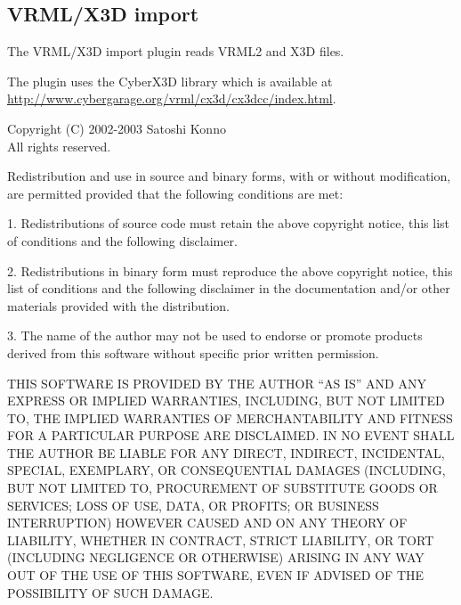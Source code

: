 
\subsection{VRML/X3D import}

The VRML/X3D import plugin reads VRML2 and X3D files.



\begin{notice}[note]
The plugin uses the CyberX3D library which is available at 
\url{http://www.cybergarage.org/vrml/cx3d/cx3dcc/index.html}.

Copyright (C) 2002-2003 Satoshi Konno\\
All rights reserved.

Redistribution and use in source and binary forms, with or without modification, are permitted provided that the following conditions are met:

1. Redistributions of source code must retain the above copyright notice, this list of conditions and the following disclaimer. 

2. Redistributions in binary form must reproduce the above copyright notice, this list of conditions and the following disclaimer in the documentation and/or other materials provided with the distribution. 

3. The name of the author may not be used to endorse or promote products derived from this software without specific prior written permission. 

THIS SOFTWARE IS PROVIDED BY THE AUTHOR ``AS IS'' AND ANY EXPRESS OR IMPLIED WARRANTIES, INCLUDING, BUT NOT LIMITED TO, THE IMPLIED WARRANTIES OF MERCHANTABILITY AND FITNESS FOR A PARTICULAR PURPOSE ARE DISCLAIMED. IN NO EVENT SHALL THE AUTHOR BE LIABLE FOR ANY DIRECT, INDIRECT, INCIDENTAL, SPECIAL, EXEMPLARY, OR CONSEQUENTIAL DAMAGES (INCLUDING, BUT NOT LIMITED TO, PROCUREMENT OF SUBSTITUTE GOODS OR SERVICES; LOSS OF USE, DATA, OR PROFITS; OR BUSINESS INTERRUPTION) HOWEVER CAUSED AND ON ANY THEORY OF LIABILITY, WHETHER IN CONTRACT, STRICT LIABILITY, OR TORT (INCLUDING NEGLIGENCE OR OTHERWISE) ARISING IN ANY WAY OUT OF THE USE OF THIS SOFTWARE, EVEN IF ADVISED OF THE POSSIBILITY OF SUCH DAMAGE.
\end{notice}

